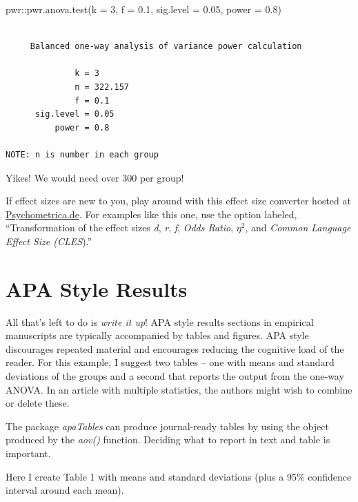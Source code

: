 \documentclass[
  11pt,
]{book}
\newenvironment{Shaded}{\begin{snugshade}}{\end{snugshade}}
\newcommand{\AttributeTok}[1]{\textcolor[rgb]{0.77,0.63,0.00}{#1}}
\newcommand{\DecValTok}[1]{\textcolor[rgb]{0.00,0.00,0.81}{#1}}
\newcommand{\FloatTok}[1]{\textcolor[rgb]{0.00,0.00,0.81}{#1}}
\newcommand{\FunctionTok}[1]{\textcolor[rgb]{0.00,0.00,0.00}{#1}}
\newcommand{\NormalTok}[1]{#1}
\newcommand{\SpecialCharTok}[1]{\textcolor[rgb]{0.00,0.00,0.00}{#1}}
\begin{document}
\begin{Shaded}
\begin{Highlighting}[]
\NormalTok{pwr}\SpecialCharTok{::}\FunctionTok{pwr.anova.test}\NormalTok{(}\AttributeTok{k =} \DecValTok{3}\NormalTok{, }\AttributeTok{f =} \FloatTok{0.1}\NormalTok{, }\AttributeTok{sig.level =} \FloatTok{0.05}\NormalTok{, }\AttributeTok{power =} \FloatTok{0.8}\NormalTok{)}
\end{Highlighting}
\end{Shaded}

\begin{verbatim}

     Balanced one-way analysis of variance power calculation 

              k = 3
              n = 322.157
              f = 0.1
      sig.level = 0.05
          power = 0.8

NOTE: n is number in each group
\end{verbatim}

Yikes! We would need over 300 per group!

If effect sizes are new to you, play around with this effect size converter hosted at \href{https://www.psychometrica.de/effect_size.html}{Psychometrica.de}. For examples like this one, use the option labeled, ``Transformation of the effect sizes \emph{d}, \emph{r}, \emph{f}, \emph{Odds Ratio}, \(\eta^2\), and \emph{Common Language Effect Size (CLES}).''

\hypertarget{apa-style-results-3}{%
\section{APA Style Results}\label{apa-style-results-3}}

All that's left to do is \emph{write it up}! APA style results sections in empirical manuscripts are typically accompanied by tables and figures. APA style discourages repeated material and encourages reducing the cognitive load of the reader. For this example, I suggest two tables -- one with means and standard deviations of the groups and a second that reports the output from the one-way ANOVA. In an article with multiple statistics, the authors might wish to combine or delete these.

The package \emph{apaTables} can produce journal-ready tables by using the object produced by the \emph{aov()} function. Deciding what to report in text and table is important.

Here I create Table 1 with means and standard deviations (plus a 95\% confidence interval around each mean).
\end{document}
